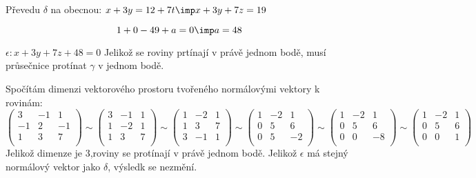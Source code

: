	    Převedu $\delta$ na obecnou:
	    $x+3y = 12 +7t \imp x+3y+7z =19$
	    
	    $$ 1+0-49+a=0 \imp a=48$$
	    
	    \underline{$\epsilon: x+3y+7z+48=0$}
	    Jelikož se roviny prtínají v právě jednom bodě, musí průsečnice protínat $\gamma$ v jednom bodě.

	    Spočítám dimenzi vektorového prostoru tvořeného normálovými vektory k rovinám:
	     $ \begin{pmatrix}
		     3 &-1 & 1 \\ 
		     -1 &2 & -1 \\ 
		     1 &3 & 7 \\ 
	     \end{pmatrix}
	     \sim
	     \begin{pmatrix}
		     3 &-1 & 1 \\ 
		     1 &-2 & 1 \\ 
		     1 &3 & 7 \\ 
	     \end{pmatrix}
	     \sim
	     \begin{pmatrix}
		     1 &-2 & 1 \\ 
		     1 &3 & 7 \\ 
		     3 &-1 & 1 \\ 
	     \end{pmatrix}
	     \sim
	     \begin{pmatrix}
		     1 &-2 & 1 \\ 
		     0 &5 & 6 \\ 
		     0 &5 & -2 \\ 
	     \end{pmatrix}
	     \sim
	     \begin{pmatrix}
		     1 &-2 & 1 \\ 
		     0 &5 & 6 \\ 
		     0 &0 & -8 \\ 
	     \end{pmatrix}
	     \sim
	     \begin{pmatrix}
		     1 &-2 & 1 \\ 
		     0 &5 & 6 \\ 
		     0 &0 & 1 \\ 
	     \end{pmatrix}
	      $ 
	      Jelikož dimenze je 3,roviny se protínají v právě jednom bodě.
	      Jelikož $\epsilon$ má stejný normálový vektor jako $\delta$, výsledk se nezmění.

\EndDoc
